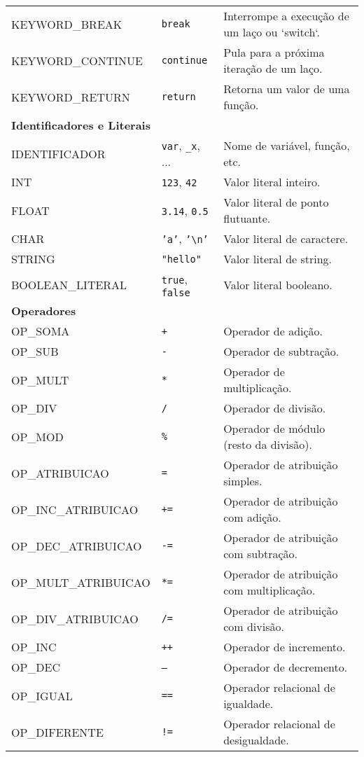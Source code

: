\documentclass[12pt,a4paper]{article}
\begin{document}
\begin{longtable}{lll}
KEYWORD\_BREAK & \texttt{break} & Interrompe a execução de um laço ou `switch`. \\
KEYWORD\_CONTINUE & \texttt{continue} & Pula para a próxima iteração de um laço. \\
KEYWORD\_RETURN & \texttt{return} & Retorna um valor de uma função. \\
\midrule
\multicolumn{3}{l}{\textbf{Identificadores e Literais}} \\
\midrule
IDENTIFICADOR & \texttt{var}, \texttt{\_x}, ... & Nome de variável, função, etc. \\
INT & \texttt{123}, \texttt{42} & Valor literal inteiro. \\
FLOAT & \texttt{3.14}, \texttt{0.5} & Valor literal de ponto flutuante. \\
CHAR & \texttt{'a'}, \texttt{'\textbackslash n'} & Valor literal de caractere. \\
STRING & \texttt{"hello"} & Valor literal de string. \\
BOOLEAN\_LITERAL & \texttt{true}, \texttt{false} & Valor literal booleano. \\
\midrule
\multicolumn{3}{l}{\textbf{Operadores}} \\
\midrule
OP\_SOMA & \texttt{+} & Operador de adição. \\
OP\_SUB & \texttt{-} & Operador de subtração. \\
OP\_MULT & \texttt{*} & Operador de multiplicação. \\
OP\_DIV & \texttt{/} & Operador de divisão. \\
OP\_MOD & \texttt{\%} & Operador de módulo (resto da divisão). \\
OP\_ATRIBUICAO & \texttt{=} & Operador de atribuição simples. \\
OP\_INC\_ATRIBUICAO & \texttt{+=} & Operador de atribuição com adição. \\
OP\_DEC\_ATRIBUICAO & \texttt{-=} & Operador de atribuição com subtração. \\
OP\_MULT\_ATRIBUICAO & \texttt{*=} & Operador de atribuição com multiplicação. \\
OP\_DIV\_ATRIBUICAO & \texttt{/=} & Operador de atribuição com divisão. \\
OP\_INC & \texttt{++} & Operador de incremento. \\
OP\_DEC & \texttt{--} & Operador de decremento. \\
OP\_IGUAL & \texttt{==} & Operador relacional de igualdade. \\
OP\_DIFERENTE & \texttt{!=} & Operador relacional de desigualdade. \\

\end{longtable}
\end{document}
